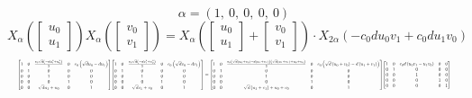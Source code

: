 \documentclass[11pt]{article}
\theoremstyle{definition}
\begin{document}
\[
\alpha = \left( 1, \  0, \  0, \  0, \  0\right)
\]
\[
X_{\alpha}\left(\left[\begin{matrix}u_{0}\\u_{1}\end{matrix}\right]\right) X_{\alpha}\left(\left[\begin{matrix}v_{0}\\v_{1}\end{matrix}\right]\right) = X_{\alpha}\left(\left[\begin{matrix}u_{0}\\u_{1}\end{matrix}\right] + \left[\begin{matrix}v_{0}\\v_{1}\end{matrix}\right]\right) \cdot X_{2\alpha}\left(- c_{0} d u_{0} v_{1} + c_{0} d u_{1} v_{0}\right)
\]
\[
\resizebox{\textwidth}{!}{${\left[\begin{matrix}1 & 0 & \frac{c_{0} \sqrt{d} \left(- d u_{1}^{2} + u_{0}^{2}\right)}{2} & 0 & c_{0} \left(\sqrt{d} u_{0} - d u_{1}\right)\\0 & 1 & 0 & 0 & 0\\0 & 0 & 1 & 0 & 0\\0 & 0 & 0 & 1 & 0\\0 & 0 & \sqrt{d} u_{1} + u_{0} & 0 & 1\end{matrix}\right]} {\left[\begin{matrix}1 & 0 & \frac{c_{0} \sqrt{d} \left(- d v_{1}^{2} + v_{0}^{2}\right)}{2} & 0 & c_{0} \left(\sqrt{d} v_{0} - d v_{1}\right)\\0 & 1 & 0 & 0 & 0\\0 & 0 & 1 & 0 & 0\\0 & 0 & 0 & 1 & 0\\0 & 0 & \sqrt{d} v_{1} + v_{0} & 0 & 1\end{matrix}\right]} = {\left[\begin{matrix}1 & 0 & \frac{c_{0} \left(\sqrt{d} \left(u_{0} + v_{0}\right) - d \left(u_{1} + v_{1}\right)\right) \left(\sqrt{d} \left(u_{1} + v_{1}\right) + u_{0} + v_{0}\right)}{2} & 0 & c_{0} \left(\sqrt{d} \left(u_{0} + v_{0}\right) - d \left(u_{1} + v_{1}\right)\right)\\0 & 1 & 0 & 0 & 0\\0 & 0 & 1 & 0 & 0\\0 & 0 & 0 & 1 & 0\\0 & 0 & \sqrt{d} \left(u_{1} + v_{1}\right) + u_{0} + v_{0} & 0 & 1\end{matrix}\right]} {\left[\begin{matrix}1 & 0 & c_{0} d \left(u_{0} v_{1} - u_{1} v_{0}\right) & 0 & 0\\0 & 1 & 0 & 0 & 0\\0 & 0 & 1 & 0 & 0\\0 & 0 & 0 & 1 & 0\\0 & 0 & 0 & 0 & 1\end{matrix}\right]}$}
\]
\end{document}
